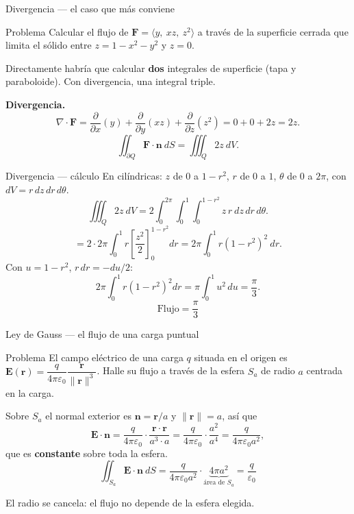 \documentclass[11pt,aspectratio=169]{beamer}
\begin{document}
\begin{frame}{Divergencia --- el caso que más conviene}
  \begin{block}{Problema}
    Calcular el flujo de $\mathbf F=\langle y,\ xz,\ z^2\rangle$ a través de la superficie cerrada que limita el sólido entre $z=1-x^2-y^2$ y $z=0$.
  \end{block}
  \pause
  \begin{center}\small\color{brick}
  Directamente habría que calcular \textbf{dos} integrales de superficie (tapa y paraboloide). Con divergencia, una integral triple.
  \end{center}
  \pause
  \textbf{Divergencia.}
  \[
    \nabla\cdot\mathbf F = \frac{\partial}{\partial x}(y)+\frac{\partial}{\partial y}(xz)+\frac{\partial}{\partial z}(z^2)
    = 0+0+2z = 2z.
  \]
  \pause
  \[
    \iint_{\partial Q}\mathbf F\cdot\mathbf n\ dS = \iiint_Q 2z\ dV.
  \]
\end{frame}

\begin{frame}{Divergencia --- cálculo}
  En cilíndricas: $z$ de $0$ a $1-r^2$, $r$ de $0$ a $1$, $\theta$ de $0$ a $2\pi$, con $dV=r\,dz\,dr\,d\theta$.
  \[
    \iiint_Q 2z\ dV
    = 2\int_0^{2\pi}\!\!\int_0^1\!\!\int_0^{1-r^2} z\,r\ dz\,dr\,d\theta.
  \]
  \pause
  \[
    = 2\cdot2\pi\int_0^1 r\left[\frac{z^2}{2}\right]_0^{1-r^2} dr
    = 2\pi\int_0^1 r(1-r^2)^2\ dr.
  \]
  \pause
  Con $u=1-r^2$, $r\,dr=-du/2$:
  \[
    2\pi\int_0^1 r(1-r^2)^2 dr = \pi\int_0^1 u^2\,du = \frac{\pi}{3}.
  \]
  \pause
  \[
    \boxed{\text{Flujo} = \frac{\pi}{3}}
  \]
\end{frame}

\begin{frame}{Ley de Gauss --- el flujo de una carga puntual}
  \begin{block}{Problema}
    El campo eléctrico de una carga $q$ situada en el origen es
    $\mathbf E(\mathbf r)=\dfrac{q}{4\pi\varepsilon_0}\dfrac{\mathbf r}{\|\mathbf r\|^{3}}$.
    Halle su flujo a través de la esfera $S_a$ de radio $a$ centrada en la carga.
  \end{block}
  \pause
  Sobre $S_a$ el normal exterior es $\mathbf n=\mathbf r/a$ y $\|\mathbf r\|=a$, así que
  \[
    \mathbf E\cdot\mathbf n
    = \frac{q}{4\pi\varepsilon_0}\cdot\frac{\mathbf r\cdot\mathbf r}{a^{3}\cdot a}
    = \frac{q}{4\pi\varepsilon_0}\cdot\frac{a^{2}}{a^{4}}
    = \frac{q}{4\pi\varepsilon_0 a^{2}},
  \]
  que es \textbf{constante} sobre toda la esfera.
  \pause
  \[
    \iint_{S_a}\mathbf E\cdot\mathbf n\ dS
    = \frac{q}{4\pi\varepsilon_0 a^{2}}\cdot\underbrace{4\pi a^{2}}_{\text{área de }S_a}
    = \boxed{\frac{q}{\varepsilon_0}}
  \]
  \pause
  \begin{center}\normalsize\color{tealx} El radio se cancela: el flujo no depende de la esfera elegida.\end{center}
\end{frame}
\end{document}

